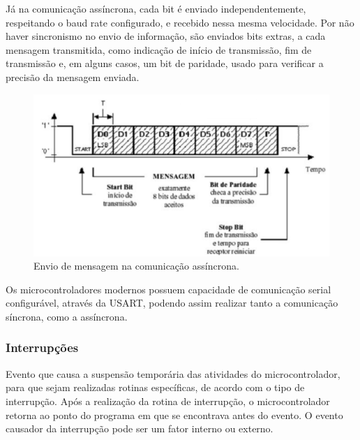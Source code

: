 Já na comunicação assíncrona, cada bit é enviado independentemente, respeitando o baud rate configurado, e recebido nessa mesma velocidade. Por não haver sincronismo no envio de informação, são enviados bits extras, a cada mensagem transmitida, como indicação de início de transmissão, fim de transmissão e, em alguns casos, um bit de paridade, usado para verificar a precisão da mensagem enviada.

\begin{figure}[ht]
    \begin{center}
    \includegraphics{figuras/assincrono.PNG}
    \end{center}
    \caption[Comunicação assíncrona]{Envio de mensagem na comunicação assíncrona.}
    \label{assincrono}
\end{figure}

Os microcontroladores modernos possuem capacidade de comunicação serial configurável, através da USART, podendo assim realizar tanto a comunicação síncrona, como a assíncrona.

\subsubsection{Interrupções}

Evento que causa a suspensão temporária das atividades do microcontrolador, para que sejam realizadas rotinas específicas, de acordo com o tipo de interrupção. Após a realização da rotina de interrupção, o microcontrolador retorna ao ponto do programa em que se encontrava antes do evento. O evento causador da interrupção pode ser um fator interno ou externo. %


